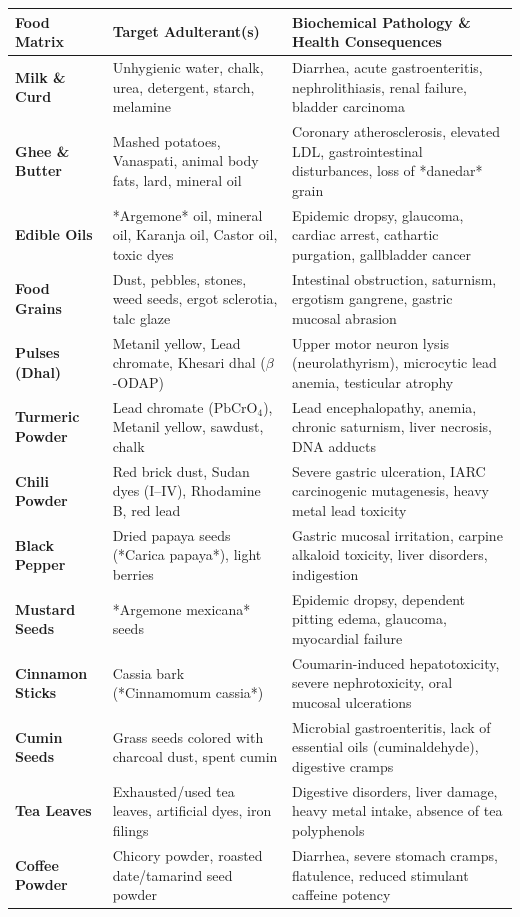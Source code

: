 \documentclass[11pt,a4paper,oneside]{article}
\begin{document}
\begin{center}
\begin{tabular}{@{}p{3.2cm} p{5.0cm} p{7.6cm}@{}}
\toprule
\textbf{Food Matrix} & \textbf{Target Adulterant(s)} & \textbf{Biochemical Pathology \& Health Consequences} \tabularnewline
\midrule
\textbf{Milk \& Curd} & Unhygienic water, chalk, urea, detergent, starch, melamine & Diarrhea, acute gastroenteritis, nephrolithiasis, renal failure, bladder carcinoma \tabularnewline
\textbf{Ghee \& Butter} & Mashed potatoes, Vanaspati, animal body fats, lard, mineral oil & Coronary atherosclerosis, elevated LDL, gastrointestinal disturbances, loss of *danedar* grain \tabularnewline
\textbf{Edible Oils} & *Argemone* oil, mineral oil, Karanja oil, Castor oil, toxic dyes & Epidemic dropsy, glaucoma, cardiac arrest, cathartic purgation, gallbladder cancer \tabularnewline
\textbf{Food Grains} & Dust, pebbles, stones, weed seeds, ergot sclerotia, talc glaze & Intestinal obstruction, saturnism, ergotism gangrene, gastric mucosal abrasion \tabularnewline
\textbf{Pulses (Dhal)} & Metanil yellow, Lead chromate, Khesari dhal ($\beta$-ODAP) & Upper motor neuron lysis (neurolathyrism), microcytic lead anemia, testicular atrophy \tabularnewline
\textbf{Turmeric Powder} & Lead chromate ($\mathrm{PbCrO_4}$), Metanil yellow, sawdust, chalk & Lead encephalopathy, anemia, chronic saturnism, liver necrosis, DNA adducts \tabularnewline
\textbf{Chili Powder} & Red brick dust, Sudan dyes (I--IV), Rhodamine B, red lead & Severe gastric ulceration, IARC carcinogenic mutagenesis, heavy metal lead toxicity \tabularnewline
\textbf{Black Pepper} & Dried papaya seeds (*Carica papaya*), light berries & Gastric mucosal irritation, carpine alkaloid toxicity, liver disorders, indigestion \tabularnewline
\textbf{Mustard Seeds} & *Argemone mexicana* seeds & Epidemic dropsy, dependent pitting edema, glaucoma, myocardial failure \tabularnewline
\textbf{Cinnamon Sticks} & Cassia bark (*Cinnamomum cassia*) & Coumarin-induced hepatotoxicity, severe nephrotoxicity, oral mucosal ulcerations \tabularnewline
\textbf{Cumin Seeds} & Grass seeds colored with charcoal dust, spent cumin & Microbial gastroenteritis, lack of essential oils (cuminaldehyde), digestive cramps \tabularnewline
\textbf{Tea Leaves} & Exhausted/used tea leaves, artificial dyes, iron filings & Digestive disorders, liver damage, heavy metal intake, absence of tea polyphenols \tabularnewline
\textbf{Coffee Powder} & Chicory powder, roasted date/tamarind seed powder & Diarrhea, severe stomach cramps, flatulence, reduced stimulant caffeine potency \tabularnewline

\end{tabular}
\end{center}
\end{document}
